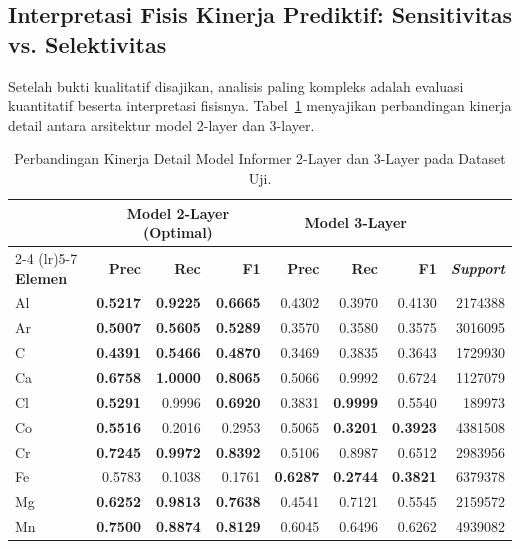\subsection{Interpretasi Fisis Kinerja Prediktif: Sensitivitas vs. Selektivitas}
Setelah bukti kualitatif disajikan, analisis paling kompleks adalah evaluasi kuantitatif beserta interpretasi fisisnya. Tabel~\ref{tab:perbandingan_lengkap} menyajikan perbandingan kinerja detail antara arsitektur model 2-layer dan 3-layer.
\begin{table}[H]
    \centering
    \begin{threeparttable}
    \small
    \caption{Perbandingan Kinerja Detail Model Informer 2-Layer dan 3-Layer pada Dataset Uji.}
    \label{tab:perbandingan_lengkap}
    \begin{tabular}{l rrr rrr r}
        \toprule
        & \multicolumn{3}{c}{\textbf{Model 2-Layer (Optimal)}} & \multicolumn{3}{c}{\textbf{Model 3-Layer}} & \\
        \cmidrule(lr){2-4} \cmidrule(lr){5-7}
        \textbf{Elemen} & \textbf{Prec} & \textbf{Rec} & \textbf{F1} & \textbf{Prec} & \textbf{Rec} & \textbf{F1} & \textbf{\textit{Support}} \\
        \midrule
        Al & \textbf{0.5217} & \textbf{0.9225} & \textbf{0.6665} & 0.4302 & 0.3970 & 0.4130 & 2174388 \\
        Ar & \textbf{0.5007} & \textbf{0.5605} & \textbf{0.5289} & 0.3570 & 0.3580 & 0.3575 & 3016095 \\
        C  & \textbf{0.4391} & \textbf{0.5466} & \textbf{0.4870} & 0.3469 & 0.3835 & 0.3643 & 1729930 \\
        Ca & \textbf{0.6758} & \textbf{1.0000} & \textbf{0.8065} & 0.5066 & 0.9992 & 0.6724 & 1127079 \\
        Cl & \textbf{0.5291} & 0.9996 & \textbf{0.6920} & 0.3831 & \textbf{0.9999} & 0.5540 & 189973 \\
        Co & \textbf{0.5516} & 0.2016 & 0.2953 & 0.5065 & \textbf{0.3201} & \textbf{0.3923} & 4381508 \\
        Cr & \textbf{0.7245} & \textbf{0.9972} & \textbf{0.8392} & 0.5106 & 0.8987 & 0.6512 & 2983956 \\
        Fe & 0.5783 & 0.1038 & 0.1761 & \textbf{0.6287} & \textbf{0.2744} & \textbf{0.3821} & 6379378 \\
        Mg & \textbf{0.6252} & \textbf{0.9813} & \textbf{0.7638} & 0.4541 & 0.7121 & 0.5545 & 2159572 \\
        Mn & \textbf{0.7500} & \textbf{0.8874} & \textbf{0.8129} & 0.6045 & 0.6496 & 0.6262 & 4939082 \\

\end{tabular}
\end{threeparttable}
\end{table}
